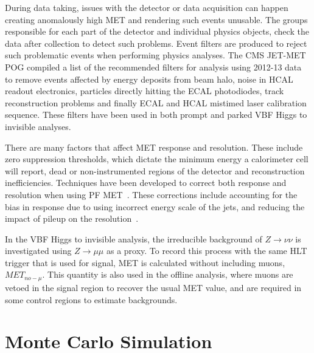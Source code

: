 During data taking, issues with the detector or data acquisition can happen creating anomalously high \gls{MET} and rendering such events unusable. The groups responsible for each part of the detector and individual physics objects, check the data after collection to detect such problems. Event filters are produced to reject such problematic events when performing physics analyses.  The \gls{CMS} JET-MET \gls{POG} compiled a list of the recommended filters for analysis using 2012-13 data to remove events affected by energy deposits from beam halo, noise in \gls{HCAL} readout electronics, particles directly hitting the \gls{ECAL} photodiodes, track reconstruction problems and finally \gls{ECAL} and \gls{HCAL} mistimed laser calibration sequence. These filters have been used in both prompt and parked \gls{VBF} Higgs to invisible analyses.

There are many factors that affect \gls{MET} response and resolution. These include zero suppression thresholds, which dictate the minimum energy a calorimeter cell will report, dead or non-instrumented regions of the detector and reconstruction inefficiencies. Techniques have been developed to correct both response and resolution when using \gls{PF} \gls{MET}~\cite{ARTICLE:CMSMissingTransverseEnergyPerformance}. These corrections include accounting for the bias in response due to using incorrect energy scale of the jets, and reducing the impact of pileup on the resolution~\cite{ARTICLE:CMSMETPerformance8TeV}.

In the \gls{VBF} Higgs to invisible analysis, the irreducible background of $Z \rightarrow \nu\nu$ is investigated using $Z \rightarrow \mu\mu$ as a proxy. To record this process with the same \gls{HLT} trigger that is used for signal, \gls{MET} is calculated without including muons, $MET_{no-\mu}$. This quantity is also used in the offline analysis, where muons are vetoed in the signal region to recover the usual \gls{MET} value, and are required in some control regions to estimate backgrounds.



\section{Monte Carlo Simulation}
\label{SECTION:EventReconstructionAndSimulation_MonteCarloSimulation}

